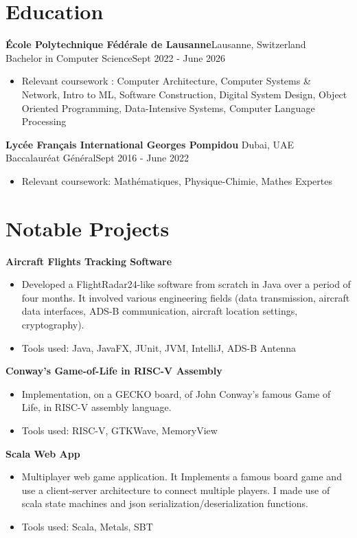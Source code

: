 \documentclass[a4paper, 10pt]{article}
\newenvironment{highlights}{
    \begin{itemize}[
        topsep=0.10 cm,
        parsep=0.10 cm,
        partopsep=0pt,
        itemsep=0pt,
        leftmargin=0.4 cm + 10pt
    ]
}{
    \end{itemize}
} %
\let\hrefWithoutArrow\href
\renewcommand{\href}[2]{\hrefWithoutArrow{#1}{\ifthenelse{\equal{#2}{}}{ }{#2 }\raisebox{.15ex}{\footnotesize \faExternalLink*}}}
\begin{document}
    \section{Education}
        \textbf{École Polytechnique Fédérale de Lausanne}\hfill Lausanne, Switzerland\\
        Bachelor in Computer Science\hfill Sept 2022 - June 2026
        \begin{highlights}
            \item Relevant coursework : Computer Architecture, Computer Systems \& Network, Intro to ML, Software Construction, Digital System Design, Object Oriented Programming, 
            Data-Intensive Systems, Computer Language Processing %
        \end{highlights}
        \textbf{Lycée Français International Georges Pompidou} \hfill Dubai, UAE\\
        Baccalauréat Général\hfill Sept 2016 - June 2022
        \begin{highlights}
            \item Relevant coursework: Mathématiques, Physique-Chimie, Mathes Expertes
        \end{highlights}
    
    \section{Notable Projects} 
        \textbf{Aircraft Flights Tracking Software}\href{https://github.com/relogamimano/Javions}{}
        \begin{highlights}
            \item Developed a FlightRadar24-like software from scratch in Java over a period of four months. It involved various
            engineering fields (data transmission, aircraft data interfaces, ADS-B communication, aircraft location settings, cryptography).
            \item Tools used: Java, JavaFX, JUnit, JVM, IntelliJ, ADS-B Antenna
        \end{highlights}

        \textbf{Conway's Game-of-Life in RISC-V Assembly}\href{https://github.com/relogamimano/Conway-s-Game-of-Life-in-RISC-V-Assembly}{}
        \begin{highlights}
            \item Implementation, on a GECKO board, of John Conway's famous Game of Life, in RISC-V assembly language.
            \item Tools used: RISC-V, GTKWave, MemoryView
        \end{highlights}
        \textbf{Scala Web App}\href{https://github.com/relogamimano/Scala-Web-App}{}
        \begin{highlights}
            \item Multiplayer web game application. It Implements a famous board game and use a client-server architecture to connect multiple players. I made use of scala state machines and json serialization/deserialization functions.
            \item Tools used: Scala, Metals, SBT
        \end{highlights}
\end{document}
